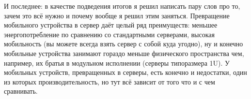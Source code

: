 \documentclass[10pt, a5paper]{article}
\begin{document}
И последнее: в качестве подведения итогов я решил написать пару слов про то, зачем это всё нужно и почему вообще я решил этим заняться. Превращение мобильного устройства в сервер даёт целый ряд преимуществ: меньшее энергопотребление по сравнению со стандартными серверами, высокая мобильность (вы можете всегда взять сервер с собой куда угодно), ну и конечно мобильные устройства занимают гораздо меньше физического пространства чем, например, их братья в модульном исполнении (серверы типоразмера 1U). У мобильных устройств, превращенных в серверы, есть конечно и недостатки, один из которых производительность, но тут всё зависит от того что и с чем сравнивать.
\end{document}
